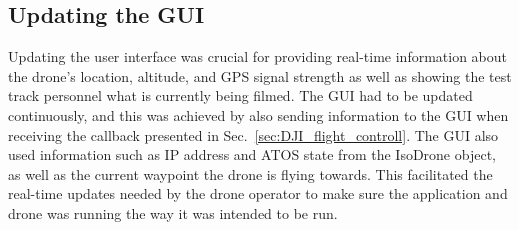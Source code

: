 \subsection{Updating the GUI} \label{sec:updating_UI}
Updating the user interface was crucial for providing real-time information about the drone's location, altitude, and GPS signal strength as well as showing the test track personnel what is currently being filmed. The GUI had to be updated continuously, and this was achieved by also sending information to the GUI when receiving the callback presented in Sec.~\ref{sec:DJI_flight_controll}. The GUI also used information such as IP address and ATOS state from the IsoDrone object, as well as the current waypoint the drone is flying towards. This facilitated the real-time updates needed by the drone operator to make sure the application and drone was running the way it was intended to be run.

